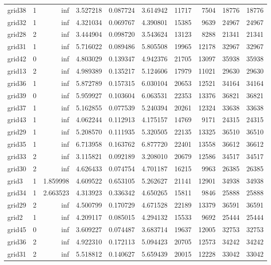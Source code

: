 \begin{longtable}{|l|r|r|r|r|r|r|r|r|r|}
grid38 & 1 & inf & 3.527218 & 0.087724 & 3.614942 & 11717 & 7504 & 18776 & 18776 \\
grid32 & 1 & inf & 4.321034 & 0.069767 & 4.390801 & 15385 & 9639 & 24967 & 24967 \\
grid28 & 2 & inf & 3.444904 & 0.098720 & 3.543624 & 13123 & 8288 & 21341 & 21341 \\
grid31 & 1 & inf & 5.716022 & 0.089486 & 5.805508 & 19965 & 12178 & 32967 & 32967 \\
grid42 & 0 & inf & 4.803029 & 0.139347 & 4.942376 & 21705 & 13097 & 35938 & 35938 \\
grid13 & 2 & inf & 4.989389 & 0.135217 & 5.124606 & 17979 & 11021 & 29630 & 29630 \\
grid36 & 1 & inf & 5.872789 & 0.157315 & 6.030104 & 20653 & 12521 & 34164 & 34164 \\
grid39 & 0 & inf & 5.959927 & 0.103604 & 6.063531 & 22353 & 13376 & 36821 & 36821 \\
grid37 & 1 & inf & 5.162855 & 0.077539 & 5.240394 & 20261 & 12324 & 33638 & 33638 \\
grid43 & 1 & inf & 4.062244 & 0.112913 & 4.175157 & 14769 & 9171 & 24315 & 24315 \\
grid29 & 1 & inf & 5.208570 & 0.111935 & 5.320505 & 22135 & 13325 & 36510 & 36510 \\
grid35 & 1 & inf & 6.713958 & 0.163762 & 6.877720 & 22401 & 13558 & 36612 & 36612 \\
grid33 & 2 & inf & 3.115821 & 0.092189 & 3.208010 & 20679 & 12586 & 34517 & 34517 \\
grid30 & 2 & inf & 4.626433 & 0.074754 & 4.701187 & 16215 & 9963 & 26385 & 26385 \\
grid3 & 1 & 1.859998 & 4.609522 & 0.653105 & 5.262627 & 21141 & 12901 & 34938 & 34938 \\
grid34 & 1 & 2.663523 & 4.313923 & 0.336342 & 4.650265 & 15811 & 9846 & 25888 & 25888 \\
grid29 & 2 & inf & 4.500799 & 0.170729 & 4.671528 & 22189 & 13379 & 36591 & 36591 \\
grid2 & 1 & inf & 4.209117 & 0.085015 & 4.294132 & 15533 & 9692 & 25444 & 25444 \\
grid45 & 0 & inf & 3.609227 & 0.074487 & 3.683714 & 19637 & 12005 & 32753 & 32753 \\
grid36 & 2 & inf & 4.922310 & 0.172113 & 5.094423 & 20705 & 12573 & 34242 & 34242 \\
grid31 & 2 & inf & 5.518812 & 0.140627 & 5.659439 & 20015 & 12228 & 33042 & 33042 \\

\end{longtable}

